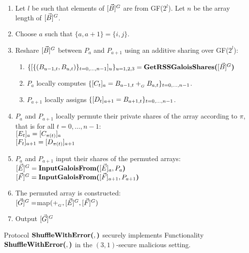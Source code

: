 \begin{protocol}
	\begin{enumerate}	
		\item Let $l$ be such that elements of $[\vec{B}]^{G}$ are from GF($2^l$).
			Let $n$ be the array length of $[\vec{B}]^{G}$.
		\item Choose $a$ such that $\{a, a+1\} = \{i, j\}$.
		\item Reshare $[\vec{B}]^{G}$ between $P_a$ and $P_{a+1}$ using an additive 
			sharing over GF($2^l$):
			\begin{enumerate}
				\item $\{[\{(B_{u-1, t}, B_{u, t})\}_{t=0,\ldots,n-1}]_{u}\}_{u=1,2,3} = \\
					\textbf{GetRSSGaloisShares(}[\vec{B}]^{G}\textbf{)}$
				\item $P_a$ locally computes $\{[C_t]_{a} = B_{a-1,t} +_{_G} B_{a,t}\}_{t=0,\ldots,n-1}$.\\
			
				\item $P_{a+1}$ locally assigns $\{[D_t]_{a+1} = B_{a+1, t}\}_{t=0,\ldots,n-1}$.
			\end{enumerate}
		\item $P_a$ and $P_{a+1}$ locally permute their private shares of the array 
			according to $\pi$, that is for all $t=0,\ldots,n-1$:\\
			$[E_t]_{a} = [C_{\pi(t)}]_{a}$\\
			$[F_t]_{a+1} = [D_{\pi(t)}]_{a+1}$
		\item $P_a$ and $P_{a+1}$ input their shares of the permuted arrays:\\
			$[\vec{E}]^{G} = \textbf{InputGaloisFrom(}[\vec{E}]_{a}, P_{a}\textbf{)}$\\
			$[\vec{F}]^{G} = \textbf{InputGaloisFrom(}[\vec{F}]_{a+1}, P_{a+1}\textbf{)}$	
		\item The permuted array is constructed:\\
			$[\vec{G}]^{G} = $map$(+_{_G}, [\vec{E}]^{G}, [\vec{F}]^{G})$
		\item Output $[\vec{G}]^{G}$
	\end{enumerate}
\end{protocol}

\begin{theorem}
	Protocol $\textbf{ShuffleWithError(}, \textbf{)}$ securely implements Functionality $\textbf{ShuffleWithError(}, \textbf{)}$ in the $(3,1)$-secure malicious setting.
\end{theorem}

